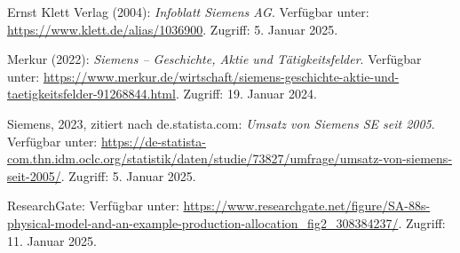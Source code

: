 \begin{thebibliography}{}

    Ernst Klett Verlag (2004): \textit{Infoblatt Siemens AG}. Verfügbar unter: \url{https://www.klett.de/alias/1036900}. Zugriff: 5. Januar 2025.
    
    Merkur (2022): \textit{Siemens – Geschichte, Aktie und Tätigkeitsfelder}. Verfügbar unter: \url{https://www.merkur.de/wirtschaft/siemens-geschichte-aktie-und-taetigkeitsfelder-91268844.html}. Zugriff: 19. Januar 2024.
    
    Siemens, 2023, zitiert nach de.statista.com: \textit{Umsatz von Siemens SE seit 2005}. Verfügbar unter: \url{https://de-statista-com.thn.idm.oclc.org/statistik/daten/studie/73827/umfrage/umsatz-von-siemens-seit-2005/}. Zugriff: 5. Januar 2025.
    
    ResearchGate: Verfügbar unter: \url{https://www.researchgate.net/figure/SA-88s-physical-model-and-an-example-production-allocation_fig2_308384237/}. Zugriff: 11. Januar 2025.
    
    \end{thebibliography}
    